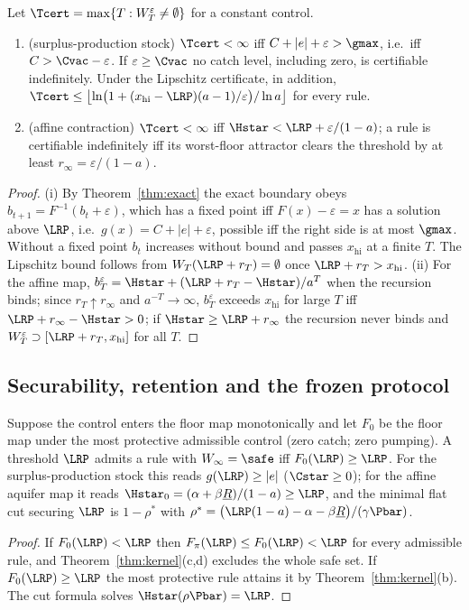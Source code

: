 \begin{proposition}\label{prop:finite}
Let $\Tcert=\max\{T:W^{\varepsilon}_T\neq\emptyset\}$ for a constant control.
\begin{enumerate}[label=(\roman*)]
\item (surplus-production stock) $\Tcert<\infty$ iff $C+|e|+\varepsilon>\gmax$, i.e.\ iff $C>\Cvac-\varepsilon$. If $\varepsilon\ge\Cvac$ no catch level, including zero, is certifiable indefinitely. Under the Lipschitz certificate, in addition, $\Tcert\le\bigl\lfloor\ln\bigl(1+(x_{\mathrm{hi}}-\LRP)(a-1)/\varepsilon\bigr)/\ln a\bigr\rfloor$ for every rule.
\item (affine contraction) $\Tcert<\infty$ iff $\Hstar<\LRP+\varepsilon/(1-a)$; a rule is certifiable indefinitely iff its worst-floor attractor clears the threshold by at least $r_\infty=\varepsilon/(1-a)$.
\end{enumerate}
\end{proposition}
\begin{proof}
(i) By Theorem~\ref{thm:exact} the exact boundary obeys $b_{t+1}=F^{-1}(b_t+\varepsilon)$, which has a fixed point iff $F(x)-\varepsilon=x$ has a solution above $\LRP$, i.e.\ $g(x)=C+|e|+\varepsilon$, possible iff the right side is at most $\gmax$. Without a fixed point $b_t$ increases without bound and passes $x_{\mathrm{hi}}$ at a finite $T$. The Lipschitz bound follows from $W_T(\LRP+r_T)=\emptyset$ once $\LRP+r_T>x_{\mathrm{hi}}$. (ii) For the affine map, $b^{\varepsilon}_T=\Hstar+(\LRP+r_T-\Hstar)/a^{T}$ when the recursion binds; since $r_T\uparrow r_\infty$ and $a^{-T}\to\infty$, $b^{\varepsilon}_T$ exceeds $x_{\mathrm{hi}}$ for large $T$ iff $\LRP+r_\infty-\Hstar>0$; if $\Hstar\ge\LRP+r_\infty$ the recursion never binds and $W^{\varepsilon}_T\supset[\LRP+r_T,x_{\mathrm{hi}}]$ for all $T$.
\end{proof}

\subsection{Securability, retention and the frozen protocol}

\begin{theorem}\label{thm:margin}
Suppose the control enters the floor map monotonically and let $F_0$ be the floor map under the most protective admissible control (zero catch; zero pumping). A threshold $\LRP$ admits a rule with $W_\infty=\safe$ iff $F_0(\LRP)\ge\LRP$. For the surplus-production stock this reads $g(\LRP)\ge|e|$ ($\Cstar\ge0$); for the affine aquifer map it reads $\Hstar_0=(\alpha+\beta\underline R)/(1-a)\ge\LRP$, and the minimal flat cut securing $\LRP$ is $1-\rho^{*}$ with
$\rho^{*}=\bigl(\LRP(1-a)-\alpha-\beta\underline R\bigr)/(\gamma\Pbar)$.
\end{theorem}
\begin{proof}
If $F_0(\LRP)<\LRP$ then $F_\pi(\LRP)\le F_0(\LRP)<\LRP$ for every admissible rule, and Theorem~\ref{thm:kernel}(c,d) excludes the whole safe set. If $F_0(\LRP)\ge\LRP$ the most protective rule attains it by Theorem~\ref{thm:kernel}(b). The cut formula solves $\Hstar(\rho\Pbar)=\LRP$.
\end{proof}

